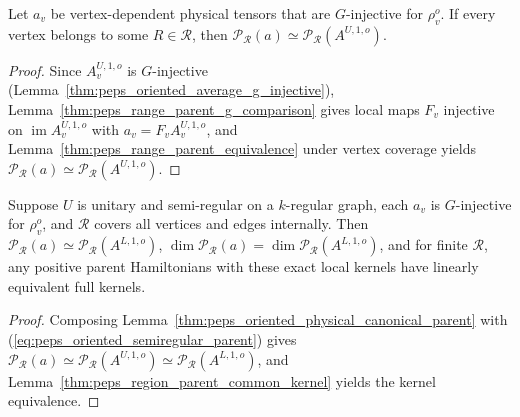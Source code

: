 \begin{lemma}%
    \label{thm:peps_oriented_physical_canonical_parent}
    \leanok
    Let $a_v$ be vertex-dependent physical tensors that are $G$-injective for $\rho_v^o$. If every vertex belongs to some $R\in\mathcal R$, then $\mathcal P_{\mathcal R}(a)\simeq\mathcal P_{\mathcal R}(A^{U,1,o})$.
\end{lemma}
\begin{proof}\leanok
    Since $A^{U,1,o}_v$ is $G$-injective (Lemma~\ref{thm:peps_oriented_average_g_injective}), Lemma~\ref{thm:peps_range_parent_g_comparison} gives local maps $F_v$ injective on $\operatorname{im}A^{U,1,o}_v$ with $a_v=F_vA^{U,1,o}_v$, and Lemma~\ref{thm:peps_range_parent_equivalence} under vertex coverage yields $\mathcal P_{\mathcal R}(a)\simeq\mathcal P_{\mathcal R}(A^{U,1,o})$.
\end{proof}

\begin{lemma}%
    \label{thm:peps_oriented_semiregular_physical_parent}
    \leanok
    Suppose $U$ is unitary and semi-regular on a $k$-regular graph, each $a_v$ is $G$-injective for $\rho_v^o$, and $\mathcal R$ covers all vertices and edges internally. Then $\mathcal P_{\mathcal R}(a)\simeq\mathcal P_{\mathcal R}(A^{L,1,o})$, $\dim\mathcal P_{\mathcal R}(a)=\dim\mathcal P_{\mathcal R}(A^{L,1,o})$, and for finite $\mathcal R$, any positive parent Hamiltonians with these exact local kernels have linearly equivalent full kernels.
\end{lemma}
\begin{proof}\leanok
    Composing Lemma~\ref{thm:peps_oriented_physical_canonical_parent} with (\ref{eq:peps_oriented_semiregular_parent}) gives $\mathcal P_{\mathcal R}(a)\simeq\mathcal P_{\mathcal R}(A^{U,1,o})\simeq\mathcal P_{\mathcal R}(A^{L,1,o})$, and Lemma~\ref{thm:peps_region_parent_common_kernel} yields the kernel equivalence.
\end{proof}
